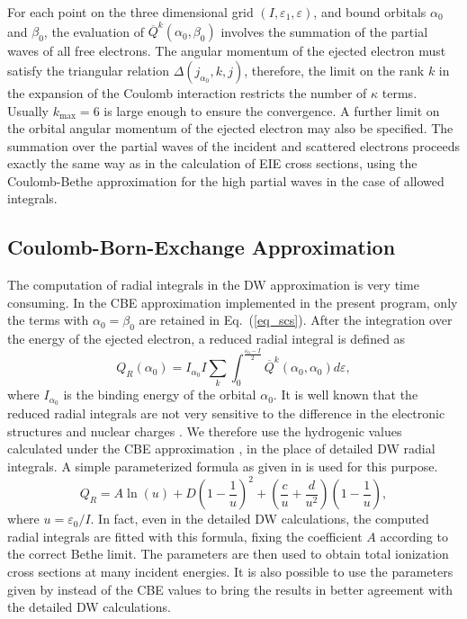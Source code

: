 For each point on the three dimensional grid $(I,\varepsilon_1, \varepsilon)$,
and bound orbitals $\alpha_0$ and $\beta_0$, the evaluation of
$\overline{Q}^k(\alpha_0,\beta_0)$ involves the summation of the  partial waves
of all free electrons. The angular momentum of the ejected electron must satisfy
the triangular relation $\Delta(j_{\alpha_0}, k, j)$, therefore, the limit on
the rank $k$ in the expansion of the Coulomb interaction restricts the number of
$\kappa$ terms. Usually $k_\mathrm{max} = 6$ is large enough to ensure the
convergence. A further limit on the orbital angular momentum of  the ejected
electron may also be specified. The summation over the partial waves of the
incident and scattered electrons proceeds exactly the same way as in the
calculation of EIE cross sections, using the Coulomb-Bethe approximation for the
high partial waves in the case of allowed integrals.

\subsection{Coulomb-Born-Exchange Approximation}
The computation of radial integrals in the DW approximation is very time
consuming. In the CBE approximation implemented in the present program, only
the terms with $\alpha_0 = \beta_0$ are retained in Eq.~(\ref{eq_scs}). After
the integration over the energy of the ejected electron, a reduced radial
integral is defined as 
\begin{equation}
\label{eq_reduced}
Q_R(\alpha_0) = I_{\alpha_0}I
\sum_k\int_0^{\frac{\varepsilon_0-I}{2}}
\overline{Q}^k(\alpha_0,\alpha_0)d\varepsilon,
\end{equation}
where $I_{\alpha_0}$ is the binding energy of the orbital $\alpha_0$. It is well
known that the reduced radial integrals are not very sensitive to the difference
in the electronic structures and nuclear charges \cite{zhang:1990b}. We
therefore use the hydrogenic values calculated under the CBE approximation
\cite{golden:1977a, golden:1980a}, in the place of detailed DW radial integrals.
A simple parameterized formula as given in \citet{zhang:1990b} is used for this
purpose. 
\begin{equation}
Q_R = A\ln(u)+D\left(1-\frac{1}{u}\right)^2+
\left(\frac{c}{u}+\frac{d}{u^2}\right)\left(1-\frac{1}{u}\right),
\end{equation}
where $u=\varepsilon_0/I$. In fact, even in the detailed DW calculations, the
computed radial integrals are fitted with this formula, fixing the coefficient
$A$ according to the correct Bethe limit. The parameters are then used to
obtain total ionization cross sections at many incident energies. It is also
possible to use the parameters given by \citet{fontes:1993a} instead of the CBE
values to bring the results in better agreement with the detailed DW
calculations. 

